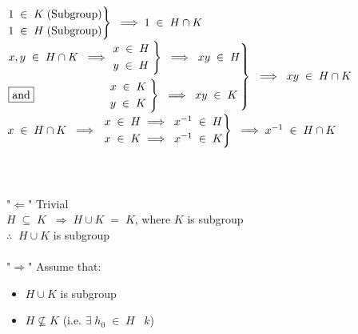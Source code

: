\documentclass{report}
\newcommand*\circled[1]{\tikz[baseline=(char.base)]{
            \node[shape=circle,draw,inner sep=2pt] (char) {#1};}}
\begin{document}
$\begin{rcases}
   1 \; \in \; K \; (\text{Subgroup})\\
   1 \; \in \; H \; (\text{Subgroup})\\
\end{rcases} \; \; \Longrightarrow \; 1 \; \in \; H \cap K$\\
$\begin{rcases}
x , y \; \in \; H \cap K\; \; \Longrightarrow \;   \begin{rcases}
   x \; \in \; H \; \\
   y \; \in \; H \; \\
\end{rcases} \; \; \Longrightarrow \; \; xy \; \in \; H \\ 
       \boxed{\text{and}} \hspace{2.3cm}  \begin{rcases}
   x \; \in \; K \; \\
   y \; \in \; K \; \\
\end{rcases} \; \; \Longrightarrow \; \; xy \; \in \; K
\end{rcases} \; \; \Longrightarrow \; \; xy \; \in \; H \cap K$\\
$x \; \in \; H \cap  K \; \; \Longrightarrow \; \; \begin{rcases}
x \; \in \; H \; \Longrightarrow \; \; x^{-1} \; \in \; H\\
   x \; \in \; K \; \Longrightarrow \; \; x^{-1} \; \in \; K \\
\end{rcases} \; \; \Longrightarrow \; x^{-1} \; \in \; H \cap K$\\
\vspace{0.3cm}\\
\circled{2}\\
\vspace{0.2cm}\\
"$\Longleftarrow$" \hspace{0.5cm} Trivial\\
$H \; \subseteq \; K \; \; \Longrightarrow \; H \cup K \; = \; K$, where $K$ is subgroup \\
$\therefore \; \; H \cup K$ is subgroup\\
\vspace{0.2cm}\\
"$\Longrightarrow$" \; \; \; Assume that:
\begin{itemize}
\item $H  \cup K$ is subgroup
\item $H \not\subseteq K$ \; \; (i.e. $\exists \; h_0 \; \in \; H$ \ $k$) 
\end{itemize}
\end{document}
